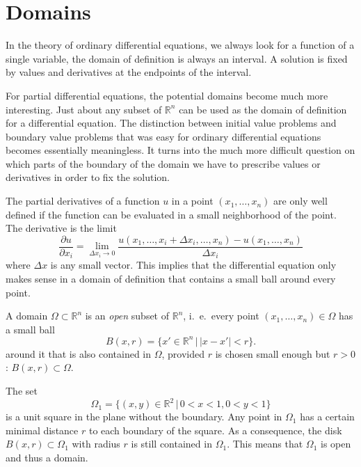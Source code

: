 %
% 
%
\section{Domains\label{klassifikation:gebiete}}
In the theory of ordinary differential equations, we always look for a function
of a single variable, the domain of definition is always an interval.
A solution is fixed by values and derivatives at the endpoints of the interval.

For partial differential equations, the potential domains become much
more interesting.
Just about any subset of $\mathbb R^n$ can be used as the domain of
definition for a differential equation.
The distinction between initial value problems and boundary value
problems that was easy for ordinary differential equations becomes
essentially meaningless.
It turns into the much more difficult question on which parts of
the boundary of the domain we have to prescribe values or derivatives
in order to fix the solution.

The partial derivatives of a function $u$ in a point $(x_1,\dots,x_n)$
are only well defined if the function can be evaluated in a small 
neighborhood of the point.
The derivative is the limit
\[
\frac{\partial u}{\partial x_i}=
\lim_{\Delta x_i\to 0}\frac{u(x_1,\dots,x_i+\Delta x_i, \dots ,x_n)-u(x_1,\dots,x_n)}{\Delta x_i}
\]
where $\Delta x$ is any small vector.
This implies that the differential equation only makes sense in a
domain of definition that contains a small ball around every point.

\begin{definition}
A domain
$\Omega\subset \mathbb R^n$ is an {\em open} subset of
$\mathbb R^n$, i.~e.~every point 
$(x_1,\dots,x_n)\in\Omega$
has a small ball
\[
B(x, r)=\{x'\in\mathbb R^n\,|\,|x-x'|<r\}.
\]
around it that is also contained in $\Omega$, provided $r$ is chosen
small enough but $r>0$:
$B(x,r)\subset\Omega$.
\end{definition}

\begin{beispiel}
The set
\[
\Omega_1=\{ (x,y)\in\mathbb R^2\,|\, 0 < x < 1, 0<y<1\}
\]
is a unit square in the plane without the boundary.
Any point in $\Omega_1$ has a certain minimal distance $r$ to each
boundary of the square.
As a consequence, the disk 
$B(x,r)\subset\Omega_1$ with radius $r$ is still contained in $\Omega_1$.
This means that $\Omega_1$ is open and thus a domain.
\end{beispiel}

